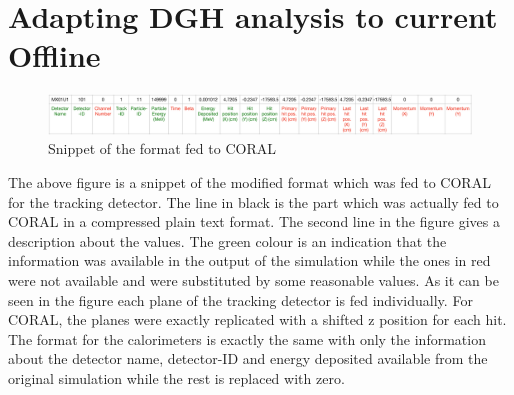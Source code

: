 \chapter{Adapting DGH analysis to current Offline}
\label{sec:app_2}
\begin{figure}[h!]
\centering
\includegraphics[width=18cm]{thesis_figures/TGEANT_format.pdf}
\caption{Snippet of the format fed to CORAL}
\label{fig:Format}
\end{figure}

The above figure is a snippet of the modified format which was fed to CORAL for the tracking detector. The line in black is the part which was actually fed to CORAL in a compressed plain text format. The second line in the figure gives a description about the values. The green colour is an indication that the information was available in the output of the simulation while the ones in red were not available and were substituted by some reasonable values. As it can be seen in the figure each plane of the tracking detector is fed individually. For CORAL, the planes were exactly replicated with a shifted z position for each hit. 
The format for the calorimeters is exactly the same with only the information about the detector name, detector-ID and energy deposited available from the original simulation while the rest is replaced with zero.
